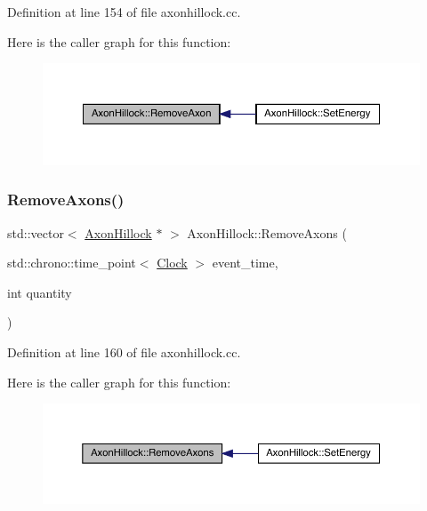 Definition at line 154 of file axonhillock.\+cc.

Here is the caller graph for this function\+:\nopagebreak
\begin{figure}[H]
\begin{center}
\leavevmode
\includegraphics[width=350pt]{class_axon_hillock_ae7c379ef3a70c8a43a0f105ccc94b54b_icgraph}
\end{center}
\end{figure}
\mbox{\label{class_axon_hillock_a7f10edff727271408887d29a70e7e671}} 
\subsubsection{\texorpdfstring{Remove\+Axons()}{RemoveAxons()}}
{\footnotesize\ttfamily std\+::vector$<$ \hyperlink{class_axon_hillock}{Axon\+Hillock} $\ast$ $>$ Axon\+Hillock\+::\+Remove\+Axons (\begin{DoxyParamCaption}\item[{std\+::chrono\+::time\+\_\+point$<$ \hyperlink{universe_8h_a0ef8d951d1ca5ab3cfaf7ab4c7a6fd80}{Clock} $>$}]{event\+\_\+time,  }\item[{int}]{quantity }\end{DoxyParamCaption})}



Definition at line 160 of file axonhillock.\+cc.

Here is the caller graph for this function\+:\nopagebreak
\begin{figure}[H]
\begin{center}
\leavevmode
\includegraphics[width=350pt]{class_axon_hillock_a7f10edff727271408887d29a70e7e671_icgraph}
\end{center}
\end{figure}
\mbox{\label{class_axon_hillock_acec1571ef0b74f7f5ce6699c9b459b4f}} 

